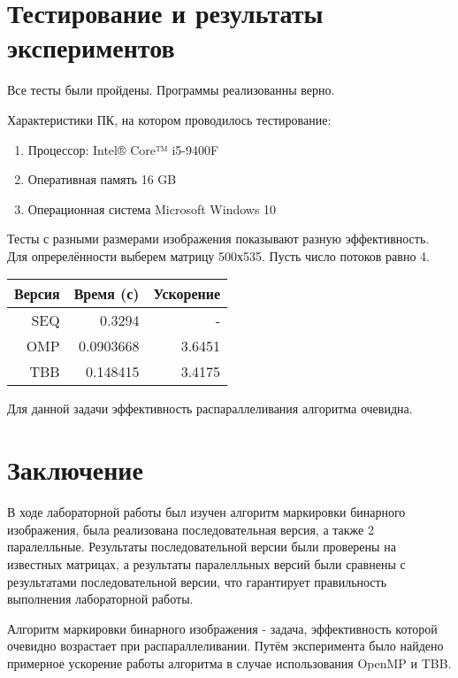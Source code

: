 \documentclass{report}
\begin{document}
\section*{Тестирование и результаты экспериментов}
Все тесты были пройдены. Программы реализованны верно.
\par Характеристики ПК, на котором проводилось тестирование:
\begin{enumerate}
    \item Процессор: Intel® Core™ i5-9400F
    \item Оперативная память 16 GB
    \item Операционная система Microsoft Windows 10
\end{enumerate}
\par Тесты с разными размерами изображения показывают разную эффективность. Для опререлённости выберем матрицу 500х535.
Пусть число потоков равно 4.
\begin{table}[!h]
\centering
\begin{tabular}{| r | r | r |}
\hline
Версия & Время (с) & Ускорение \\[5pt]
\hline
SEQ & 0.3294 & -     \\
OMP & 0.0903668 & 3.6451 \\
TBB & 0.148415 & 3.4175 \\
\hline
\end{tabular}
\end{table}
\par Для данной задачи эффективность распараллеливания алгоритма очевидна.

\newpage
\section*{Заключение}
В ходе лабораторной работы был изучен алгоритм маркировки бинарного изображения, была реализована последовательная версия, а также 2 паралелльные. Результаты последовательной версии были проверены на известных матрицах, а результаты паралелльных версий были сравнены с результатами последовательной версии, что гарантирует правильность выполнения лабораторной работы.
\par Алгоритм маркировки бинарного изображения - задача, эффективность которой очевидно возрастает при распараллеливании. Путём эксперимента было найдено примерное ускорение работы алгоритма в случае использования OpenMP и TBB.
\end{document}
